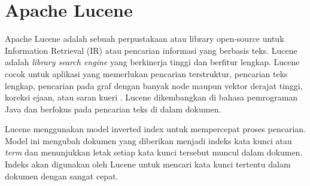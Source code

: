\section{Apache Lucene}
Apache Lucene adalah sebuah perpustakaan atau library open-source untuk Information Retrieval (IR) atau pencarian informasi yang berbasis teks. Lucene adalah \textit{library search engine} yang berkinerja tinggi dan berfitur lengkap. Lucene cocok untuk aplikasi yang memerlukan pencarian terstruktur, pencarian teks lengkap, pencarian pada graf dengan banyak node maupun vektor derajat tinggi, koreksi ejaan, atau saran kueri \parencite{apachelucene}. Lucene dikembangkan di bahasa pemrograman Java dan berfokus pada pencarian teks di dalam dokumen.

Lucene menggunakan model inverted index untuk mempercepat proses pencarian. Model ini mengubah dokumen yang diberikan menjadi indeks kata kunci atau \textit{term} dan menunjukkan letak setiap kata kunci tersebut muncul dalam dokumen. Indeks akan digunakan oleh Lucene untuk mencari kata kunci tertentu dalam dokumen dengan sangat cepat.